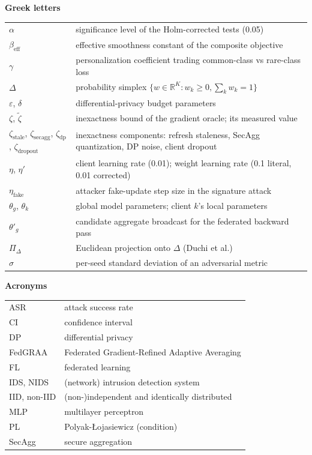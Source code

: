 \documentclass[11pt,a4paper]{report}
\newcommand{\simplex}{\Delta}
\newcommand{\proj}{\Pi_{\simplex}}
\begin{document}
\noindent\textbf{Greek letters}
\begin{center}
\begin{tabular}{@{}p{}p{}@{}}
$\alpha$ & significance level of the Holm-corrected tests (0.05)\\
$\beta_{\mathrm{eff}}$ & effective smoothness constant of the composite objective\\
$\gamma$ & personalization coefficient trading common-class vs rare-class loss\\
$\simplex$ & probability simplex $\{w\in\mathbb{R}^K:w_k\ge0,\sum_k w_k=1\}$\\
$\varepsilon$, $\delta$ & differential-privacy budget parameters\\
$\zeta$, $\tilde{\zeta}$ & inexactness bound of the gradient oracle; its measured value\\
$\zeta_{\mathrm{stale}}$, $\zeta_{\mathrm{secagg}}$, $\zeta_{\mathrm{dp}}$,
$\zeta_{\mathrm{dropout}}$ & inexactness components: refresh staleness,
SecAgg quantization, DP noise, client dropout\\
$\eta$, $\eta'$ & client learning rate (0.01); weight learning rate (0.1 literal, 0.01 corrected)\\
$\eta_{\mathrm{fake}}$ & attacker fake-update step size in the signature attack\\
$\theta_g$, $\theta_k$ & global model parameters; client $k$'s local parameters\\
$\theta'_g$ & candidate aggregate broadcast for the federated backward pass\\
$\proj$ & Euclidean projection onto $\simplex$ (Duchi et al.)\\
$\sigma$ & per-seed standard deviation of an adversarial metric\\
\end{tabular}
\end{center}

\noindent\textbf{Acronyms}
\begin{center}
\begin{tabular}{@{}p{}p{}@{}}
ASR & attack success rate\\
CI & confidence interval\\
DP & differential privacy\\
FedGRAA & Federated Gradient-Refined Adaptive Averaging\\
FL & federated learning\\
IDS, NIDS & (network) intrusion detection system\\
IID, non-IID & (non-)independent and identically distributed\\
MLP & multilayer perceptron\\
PL & Polyak-{\L}ojasiewicz (condition)\\
SecAgg & secure aggregation\\
\end{tabular}
\end{center}
\endgroup
\end{document}
